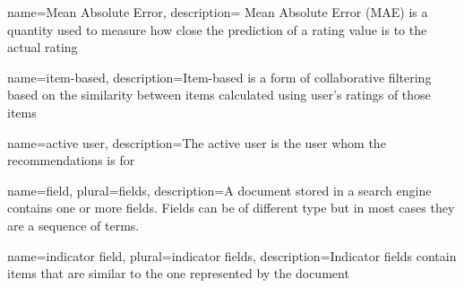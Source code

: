 {
name={Mean Absolute Error},
description={ Mean Absolute Error (MAE) is a quantity used to measure how close the prediction of a rating value is to the actual rating}
}

{
name={item-based},
description={Item-based is a form of collaborative filtering based on the similarity between items calculated using user's ratings of those items \cite{jannach}
}
}

{
name={active user},
description={The active user is the user whom the recommendations is for}
}

{
name={field},
plural={fields},
description={A document stored in a search engine  contains one or more fields. Fields can be of different type but in most cases they are a sequence of terms.}
}

{
name={indicator field},
plural={indicator fields},
description={Indicator fields contain items that are similar to the one represented by the document}
}

